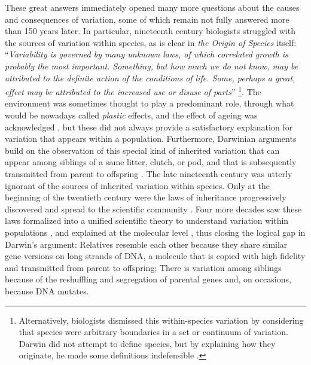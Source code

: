 These great answers immediately opened many more questions about the causes and consequences of variation, some of which remain not fully answered more than 150 years later. In particular, nineteenth century biologists struggled with the sources of variation within species, as is clear in \emph{the Origin of Species} itself:  ``\emph{Variability is governed by many unknown laws, of which correlated growth is probably the most important. Something, but how much we do not know, may be attributed to the definite action of the conditions of life. Some, perhaps a great, effect may be attributed to the increased use or disuse of parts}'' \parencite[p. 31][]{Darwin1859} \footnote{Alternatively, biologists dismissed this within-species variation by considering that species were arbitrary boundaries in a set or continuum of variation. Darwin did not attempt to define species, but by explaining how they originate, he made some definitions indefensible \parencite[][pp. 129-163]{Wilkins2009}.}. The environment was sometimes thought to play a predominant role, through what would be nowadays called \emph{plastic} effects, and the effect of ageing was acknowledged \parencite{Wilkins2009}, but these did not always provide a satisfactory explanation for variation that appears within a population.
Furthermore, Darwinian arguments build on the observation of this special kind of inherited variation that can appear among siblings of a same litter, clutch, or pod, and that is subsequently transmitted from parent to offspring \parencite[][Chapter 1]{Darwin1859}. The late nineteenth century was utterly ignorant of the sources of inherited variation within species. Only at the beginning of the twentieth century were the laws of inheritance progressively discovered and spread to the scientific community \parencite{Dietrich2006}. Four more decades saw these laws formalized into a unified scientific theory to understand variation within populations \parencite{Fisher1930}, and explained at the molecular level \parencite{Oswald1943, Watson1953}, thus closing the logical gap in Darwin's argument: Relatives resemble each other because they share similar gene versions on long strands of DNA, a molecule that is copied with high fidelity and transmitted from parent to offspring; There is variation among siblings because of the reshuffling and segregation of parental genes and, on occasions, because DNA mutates.

